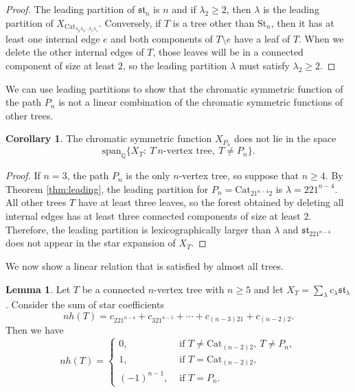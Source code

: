 \documentclass[12pt]{amsart}  %
\theoremstyle{definition}
\newtheorem{lemma}[theorem]{Lemma}
\newtheorem{corollary}[theorem]{Corollary}
\theoremstyle{remark}
\numberwithin{equation}{section}
\begin{document}
\begin{proof}
The leading partition of $\mathfrak{st}_n$ is $n$ and if $\lambda_2\geq 2$, then $\lambda$ is the leading partition of $X_{\text{Cat}_{\lambda_2\lambda_3\cdots\lambda_\ell\lambda_1}}$. Conversely, if $T$ is a tree other than $\text{St}_n$, then it has at least one internal edge $e$ and both components of $T\setminus e$ have a leaf of $T$. When we delete the other internal edges of $T$, those leaves will be in a connected component of size at least $2$, so the leading partition $\lambda$ must satisfy $\lambda_2\geq 2$. 
\end{proof}

We can use leading partitions to show that the chromatic symmetric function of the path $P_n$ is not a linear combination of the chromatic symmetric functions of other trees.

\begin{corollary}\label{cor:path}
The chromatic symmetric function $X_{P_n}$ does not lie in the space
\begin{equation}
\text{span}_{\mathbb Q}\{X_T: \ T \ n\text{-vertex tree}, \ T\neq P_n\}.
\end{equation}
\end{corollary}

\begin{proof}
If $n=3$, the path $P_n$ is the only $n$-vertex tree, so suppose that $n\geq 4$. By Theorem \ref{thm:leading}, the leading partition for $P_n=\text{Cat}_{21^{n-4}2}$ is $\lambda=221^{n-4}$. All other trees $T$ have at least three leaves, so the forest obtained by deleting all internal edges has at least three connected components of size at least $2$. Therefore, the leading partition is lexicographically larger than $\lambda$ and $\mathfrak{st}_{221^{n-4}}$ does not appear in the star expansion of $X_T$.
\end{proof}

We now show a linear relation that is satisfied by almost all trees.

\begin{lemma}\label{lem:nearhookrelation}
Let $T$ be a connected $n$-vertex tree with $n\geq 5$ and let $X_T=\sum_\lambda c_\lambda\mathfrak{st}_\lambda$. Consider the sum of star coefficients
\begin{equation}
nh(T)=c_{221^{n-4}}+c_{321^{n-5}}+\cdots+c_{(n-3)21}+c_{(n-2)2}.
\end{equation}
Then we have
\begin{equation}\label{eq:nearhookrelation}
nh(T)=\begin{cases}
0,&\text{ if }T\neq \text{Cat}_{(n-2)2}, \ T\neq P_n,\\
1,&\text{ if }T=\text{Cat}_{(n-2)2},\\
(-1)^{n-1},&\text{ if }T=P_n.
\end{cases}
\end{equation}
\end{lemma}
\end{document}

